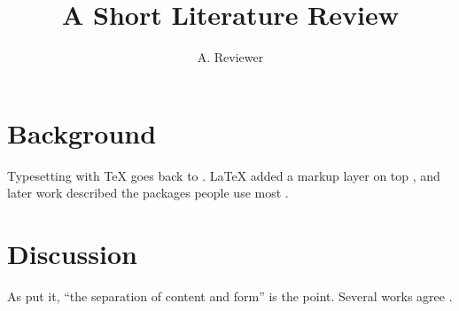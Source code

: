 \documentclass{article}
\title{A Short Literature Review}
\author{A. Reviewer}
\begin{document}
\maketitle

\section{Background}
Typesetting with \TeX{} goes back to \textcite{knuth1984}. \LaTeX{} added a
markup layer on top \parencite{lamport1994}, and later work described the
packages people use most \parencite[ch.~2]{mittelbach2004}.

\section{Discussion}
As \citeauthor{knuth1984} put it, \enquote{the separation of content and form}
is the point. Several works agree \cite{lamport1994,mittelbach2004}.

\printbibliography
\end{document}
